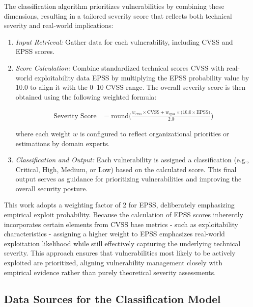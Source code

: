 The classification algorithm prioritizes vulnerabilities by combining these dimensions, resulting in a tailored severity score that reflects both technical severity and real-world implications:

\begin{enumerate}
    \item \textit{Input Retrieval:} Gather data for each vulnerability, including \ac{CVSS} and \ac{EPSS} scores.

    \item \textit{Score Calculation:} Combine standardized technical scores \ac{CVSS} with real-world exploitability data \ac{EPSS} by multiplying the \ac{EPSS} probability value by 10.0 to align it with the 0--10 \ac{CVSS} range. The overall severity score is then obtained using the following weighted formula:

\begin{align*}
\text{Severity Score} 
&= \mathrm{round}\Biggl(
    \frac{
        w_{\text{cvss}} \times \text{CVSS}
        + w_{\text{epss}} \times \bigl(10.0 \times \text{EPSS}\bigr)
    }{2.0}
\Biggr)
\end{align*}

    where each weight \( w \) is configured to reflect organizational priorities or estimations by domain experts.

    \item \textit{Classification and Output:} Each vulnerability is assigned a classification (e.g., Critical, High, Medium, or Low) based on the calculated score. This final output serves as guidance for prioritizing vulnerabilities and improving the overall security posture.
\end{enumerate}

This work adopts a weighting factor of 2 for \ac{EPSS}, deliberately emphasizing empirical exploit probability. Because the calculation of \ac{EPSS} scores inherently incorporates certain elements from \ac{CVSS} base metrics - such as exploitability characteristics - assigning a higher weight to \ac{EPSS} emphasizes real-world exploitation likelihood while still effectively capturing the underlying technical severity. This approach ensures that vulnerabilities most likely to be actively exploited are prioritized, aligning vulnerability management closely with empirical evidence rather than purely theoretical severity assessments.

\subsection{Data Sources for the Classification Model}
\label{subsec:classification-data-sources}

